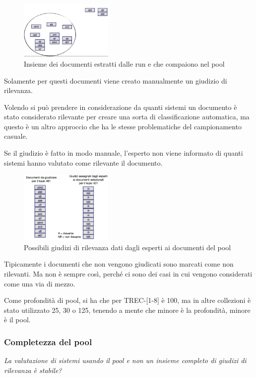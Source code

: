 \begin{figure}[htbp]
	\centering
	\includegraphics[width=0.4\textwidth]{images/l14-fig-3.png}
	\caption{Insieme dei documenti estratti dalle run e che compaiono nel pool}
\end{figure}

\noindent Solamente per questi documenti viene creato manualmente un giudizio di rilevanza.

Volendo si può prendere in considerazione da quanti sistemi un documento è stato considerato rilevante per creare una sorta di classificazione automatica, ma questo è un altro approccio che ha le stesse problematiche del campionamento casuale.

Se il giudizio è fatto in modo manuale, l'esperto non viene informato di quanti sistemi hanno valutato come rilevante il documento.

\begin{figure}[htbp]
	\centering
	\includegraphics[width=0.4\textwidth]{images/l14-fig-4.png}
	\caption{Possibili giudizi di rilevanza dati dagli esperti ai documenti del pool}
\end{figure}

Tipicamente i documenti che non vengono giudicati sono marcati come non rilevanti. Ma non è sempre così, perché ci sono dei casi in cui vengono considerati come una via di mezzo.

Come profondità di pool, si ha che per TREC-[1-8] è 100, ma in altre collezioni è stato utilizzato 25, 30 o 125, tenendo a mente che minore è la profondità, minore è il pool.

\subsubsection{Completezza del pool}
\begin{center}
\textit{La valutazione di sistemi usando il pool e non un insieme completo di giudizi di rilevanza è stabile?}
\end{center}


